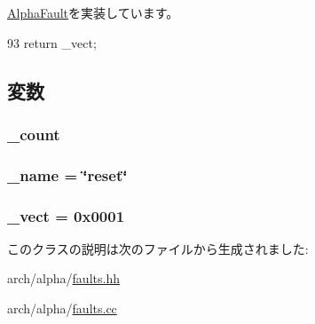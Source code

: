 \hyperlink{classAlphaISA_1_1AlphaFault_ac141ef2ab527bd4d5c079ddff2e8b4aa}{AlphaFault}を実装しています。


\begin{DoxyCode}
93 {return _vect;}
\end{DoxyCode}


\subsection{変数}
\hypertarget{classAlphaISA_1_1ResetFault_a4bff925c412f331c5aaf6a39b79619ff}{
\subsubsection[{\_\-count}]{ {\bf \_\-count}}}
\label{classAlphaISA_1_1ResetFault_a4bff925c412f331c5aaf6a39b79619ff}
\hypertarget{classAlphaISA_1_1ResetFault_ac79073ffcd2c66a09bcd3bd3ad206019}{
\subsubsection[{\_\-name}]{ {\bf \_\-name} = \char`\"{}reset\char`\"{}}}
\label{classAlphaISA_1_1ResetFault_ac79073ffcd2c66a09bcd3bd3ad206019}
\hypertarget{classAlphaISA_1_1ResetFault_ad9e5855b9db0b2824cf6c507be4a872e}{
\subsubsection[{\_\-vect}]{ {\bf \_\-vect} = 0x0001}}
\label{classAlphaISA_1_1ResetFault_ad9e5855b9db0b2824cf6c507be4a872e}


このクラスの説明は次のファイルから生成されました:\begin{DoxyCompactItemize}
\item 
arch/alpha/\hyperlink{arch_2alpha_2faults_8hh}{faults.hh}\item 
arch/alpha/\hyperlink{arch_2alpha_2faults_8cc}{faults.cc}\end{DoxyCompactItemize}
